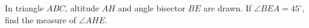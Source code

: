 In triangle $ABC$, altitude $AH$ and angle bisector $BE$ are drawn. If $\angle BEA=45^{\circ}$, find the measure of $\angle AHE$.
